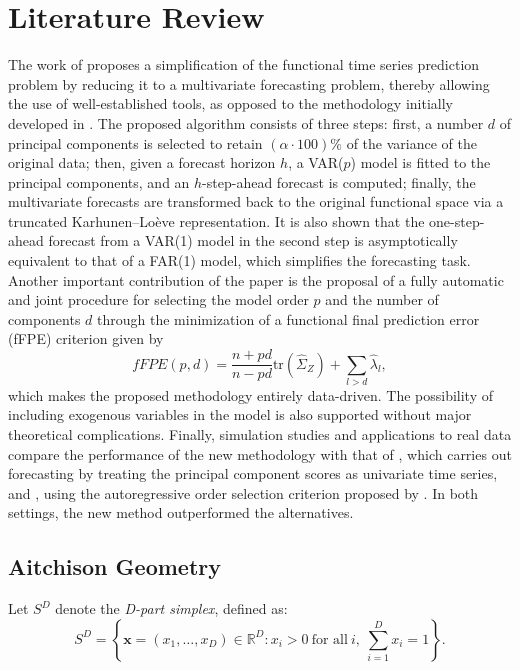 \documentclass[article]{abntex2}
\begin{document}
\section{Literature Review}
The work of  proposes a simplification of the functional time series prediction problem by reducing it to a multivariate forecasting problem, thereby allowing the use of well-established tools, as opposed to the methodology initially developed in . The proposed algorithm consists of three steps: first, a number $d$ of principal components is selected to retain $(\alpha \cdot 100)\%$ of the variance of the original data; then, given a forecast horizon $h$, a VAR($p$) model is fitted to the principal components, and an $h$-step-ahead forecast is computed; finally, the multivariate forecasts are transformed back to the original functional space via a truncated Karhunen--Lo\`eve representation. It is also shown that the one-step-ahead forecast from a VAR(1) model in the second step is asymptotically equivalent to that of a FAR(1) model, which simplifies the forecasting task. Another important contribution of the paper is the proposal of a fully automatic and joint procedure for selecting the model order $p$ and the number of components $d$ through the minimization of a functional final prediction error (fFPE) criterion given by
\begin{equation}
 \textit{fFPE}(p,d)=\frac{n+pd}{n-pd}\mathrm{tr}(\hat{\Sigma}_{Z})+\sum_{l>d}\hat{\lambda}_{l},
\end{equation}
which makes the proposed methodology entirely data-driven. The possibility of including exogenous variables in the model is also supported without major theoretical complications. Finally, simulation studies and applications to real data compare the performance of the new methodology with that of , which carries out forecasting by treating the principal component scores as univariate time series, and , using the autoregressive order selection criterion proposed by . In both settings, the new method outperformed the alternatives.


\subsection*{Aitchison Geometry}

Let $S^D$ denote the \emph{D-part simplex}, defined as:
\[
S^D = \left\{ \mathbf{x} = (x_1, \dots, x_D) \in \mathbb{R}^D : x_i > 0 \ \text{for all} \ i, \ \sum_{i=1}^D x_i = 1 \right\}.
\]
\end{document}
